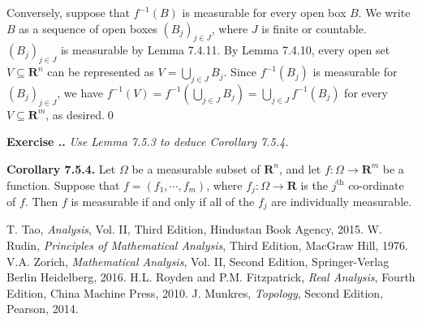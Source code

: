 \documentclass{book}
\newcommand{\titl}[1]{\noindent\textbf{#1}}
\newcounter{Exercise}[section]
\renewcommand{\theExercise}{\thesection.\arabic{Exercise}.}
\newcommand{\new}{\vspace{1.5em}\noindent\textbf{Exercise \stepcounter{Exercise}\textbf{\theExercise}} }
\begin{document}
Conversely, suppose that $f^{-1}(B)$ is measurable for every open box $B$. We write $B$ as a sequence of open boxes $(B_j)_{j \in J}$, where $J$ is finite or countable. $(B_j)_{j \in J}$ is measurable by Lemma 7.4.11. By Lemma 7.4.10, every open set $V \subseteq \mathbf{R}^n$ can be represented as $V=\bigcup_{j \in J} B_j$. Since $f^{-1}(B_j)$ is measurable for $(B_j)_{j \in J}$, we have $f^{-1}(V) = f^{-1}(\bigcup_{j \in J} B_j) = \bigcup_{j \in J} f^{-1}(B_j)$ for every $V \subseteq \mathbf{R}^m$, as desired.\qed

\new\emph{Use Lemma 7.5.3 to deduce Corollary 7.5.4.}

\begin{framed}
\titl{Corollary 7.5.4.} Let $\Omega$ be a measurable subset of $\mathbf{R}^n$, and let $f : \Omega \to \mathbf{R}^m$ be a function. Suppose that $f = (f_1, \cdots , f_m)$, where $f_j : \Omega \to \mathbf{R}$ is the $j^\text{th}$ co-ordinate of $f$. Then $f$ is measurable if and only if all of the $f_j$ are individually measurable.
\end{framed}












































































\begin{thebibliography}{99}
    T. Tao, \emph{Analysis}, Vol. II, Third Edition, Hindustan Book Agency, 2015.
    W. Rudin, \emph{Principles of Mathematical Analysis}, Third Edition, MacGraw Hill, 1976.
    V.A. Zorich, \emph{Mathematical Analysis}, Vol. II, Second Edition, Springer-Verlag Berlin Heidelberg, 2016.
    H.L. Royden and P.M. Fitzpatrick, \emph{Real Analysis}, Fourth Edition, China Machine Press, 2010.
    J. Munkres, \emph{Topology}, Second Edition, Pearson, 2014.
\end{thebibliography}
\end{document}
